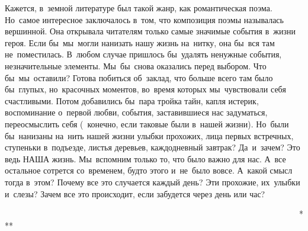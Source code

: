 \chap{***
} 
Кажется, в~земной литературе был такой жанр, как романтическая поэма.
Но~самое интересное заключалось в~том, что композиция поэмы называлась вершинной.
Она открывала читателям только самые значимые события в~жизни героя.
Если бы~мы~могли нанизать нашу жизнь на~нитку, она бы~вся там не~поместилась.
В~любом случае пришлось бы~удалять ненужные события, незначительные элементы.
Мы~бы~снова оказались перед выбором.
Что бы~мы~оставили? Готова побиться об~заклад, что больше всего там было бы~глупых, но~красочных моментов, во~время которых мы~чувствовали себя счастливыми.
Потом добавились бы~пара тройка тайн, капля истерик, воспоминание о~первой любви, события, заставившиеся нас задуматься, переосмыслить себя (~конечно, если таковые были в~нашей жизни).
Но~были бы~нанизаны на~нить нашей жизни улыбки прохожих, лица первых встречных, ступеньки в~подъезде, листья деревьев, каждодневный завтрак? Да~и~зачем? Это ведь НАША жизнь.
Мы~вспомним только то, что было важно для нас.
А~все остальное сотрется со~временем, будто этого и~не~было вовсе.
А~какой смысл тогда в~этом? Почему все это случается каждый день? Эти прохожие, их~улыбки и~слезы? Зачем все это происходит, если забудется через день или час?
 
~~~~~~~~~~~~~~~~~~~~~~~~~~~~~~~~~~~~~~~~~~~~~~~~~~~~~~~~~~~~~~~~~~~~~~~***
 
